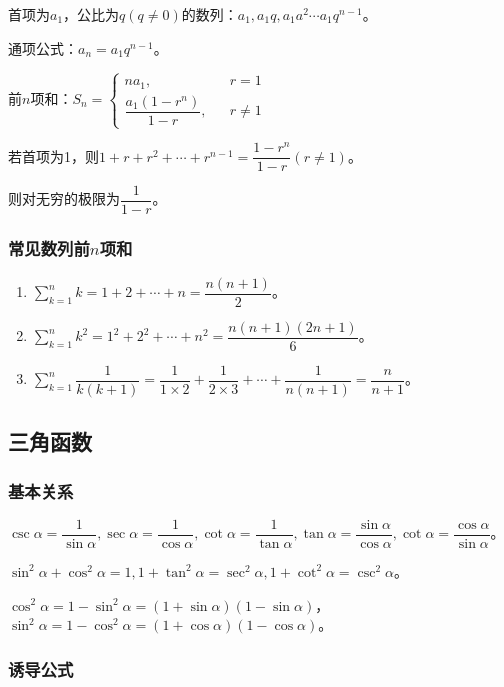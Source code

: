\documentclass[UTF8, 12pt]{ctexart}
\begin{document}
首项为$a_1$，公比为$q(q\neq 0)$的数列：$a_1,a_1q,a_1a^2\cdots a_1q^{n-1}$。

通项公式：$a_n=a_1q^{n-1}$。

前$n$项和：$S_n=
    \left\{
    \begin{array}{lcl}
        na_1,                   &  & r=1     \\
        \dfrac{a_1(1-r^n)}{1-r}, &  & r\neq 1
    \end{array}
    \right.$

若首项为1，则$1+r+r^2+\cdots+r^{n-1}=\dfrac{1-r^n}{1-r}(r\neq 1)$。

则对无穷的极限为$\dfrac{1}{1-r}$。

\subsubsection{常见数列前\texorpdfstring{$n$}n项和}

\begin{enumerate}
    \item $\sum_{k=1}^nk=1+2+\cdots+n=\dfrac{n(n+1)}{2}$。
    \item $\sum_{k=1}^nk^2=1^2+2^2+\cdots+n^2=\dfrac{n(n+1)(2n+1)}{6}$。
    \item $\sum_{k=1}^n\dfrac{1}{k(k+1)}=\dfrac{1}{1\times 2}+\dfrac{1}{2\times 3}+\cdots+\dfrac{1}{n(n+1)}=\dfrac{n}{n+1}$。
\end{enumerate}

\subsection{三角函数}

\subsubsection{基本关系}

$\csc\alpha=\dfrac{1}{\sin\alpha},\sec\alpha=\dfrac{1}{\cos\alpha},\cot\alpha=\dfrac{1}{\tan\alpha},\tan\alpha=\dfrac{\sin\alpha}{\cos\alpha},\cot\alpha=\dfrac{\cos\alpha}{\sin\alpha}$。

$\sin^2\alpha+\cos^2\alpha=1,1+\tan^2\alpha=\sec^2\alpha,1+\cot^2\alpha=\csc^2\alpha$。

$\cos^2\alpha=1-\sin^2\alpha=(1+\sin\alpha)(1-\sin\alpha)$，$\sin^2\alpha=1-\cos^2\alpha=(1+\cos\alpha)(1-\cos\alpha)$。

\subsubsection{诱导公式}
\end{document}
